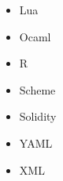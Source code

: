 \documentclass[preview]{standalone}
\begin{document}
\begin{center}
\begin{itemize}
                                \item Lua
                                \item Ocaml
                                \item R
                                \item Scheme
                                \item Solidity
                                \item YAML
                                \item XML
                            \end{itemize}
\end{center}
\end{document}
